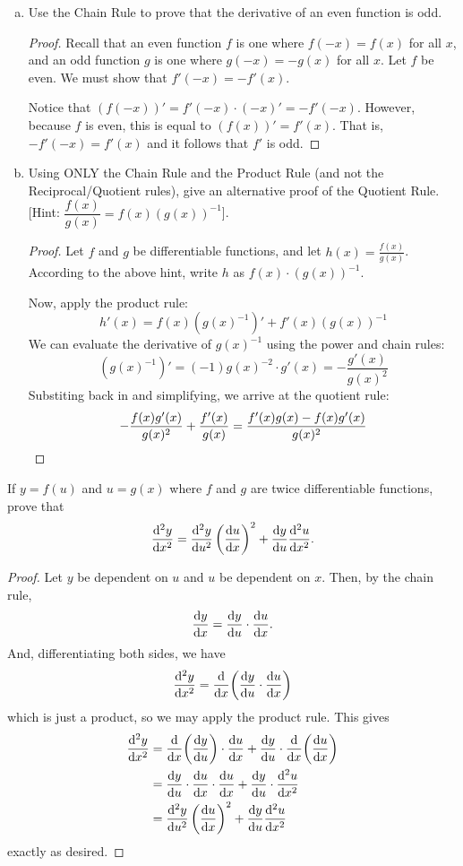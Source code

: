 \documentclass{agony}
\begin{document}
\question \begin{enumerate}[(a)]
  \item Use the Chain Rule to prove that the derivative of an even function is odd.
        \begin{proof}
          Recall that an even function $f$ is one where $f(-x)=f(x)$ for all $x$,
          and an odd function $g$ is one where $g(-x)=-g(x)$ for all $x$.
          Let $f$ be even. We must show that $f'(-x) = -f'(x)$.
          
          Notice that $(f(-x))' = f'(-x)\cdot(-x)' = -f'(-x)$.
          However, because $f$ is even, this is equal to $(f(x))' = f'(x)$.
          That is, $-f'(-x) = f'(x)$ and it follows that $f'$ is odd.
        \end{proof}
  \item Using ONLY the Chain Rule and the Product Rule (and not the Reciprocal/Quotient rules),
        give an alternative proof of the Quotient Rule.
          [Hint: $\dfrac{f(x)}{g(x)}=f(x)(g(x))^{-1}$].
        \begin{proof}
          Let $f$ and $g$ be differentiable functions, and let $h(x)=\frac{f(x)}{g(x)}$. 
          According to the above hint, write $h$ as $f(x) \cdot (g(x))^{-1}$.

          Now, apply the product rule:
          \[ h'(x) = f(x)(g(x)^{-1})' + f'(x)(g(x))^{-1} \]
          We can evaluate the derivative of $g(x)^{-1}$ using the power and chain rules:
          \[ (g(x)^{-1})' = (-1)g(x)^{-2}\cdot g'(x) = -\frac{g'(x)}{g(x)^2} \]
          Substiting back in and simplifying, we arrive at the quotient rule:
          \[ -\frac{f(x)g'(x)}{g(x)^2} + \frac{f'(x)}{g(x)} = \frac{f'(x)g(x)-f(x)g'(x)}{g(x)^2} \qedhere \]
        \end{proof}
\end{enumerate}


\question If $y=f(u)$ and $u=g(x)$ where $f$ and $g$ are twice differentiable functions, prove that
\[ \dv[2]{y}{x} = \dv[2]{y}{u}\left(\dv{u}{x}\right)^2 + \dv{y}{u}\dv[2]{u}{x}. \]
\begin{proof}
  Let $y$ be dependent on $u$ and $u$ be dependent on $x$.
  Then, by the chain rule,
  \[ \dv{y}{x} = \dv{y}{u} \cdot \dv{u}{x}. \]
  And, differentiating both sides, we have
  \[ \dv[2]{y}{x} = \dv{x}(\dv{y}{u} \cdot \dv{u}{x}) \]
  which is just a product, so we may apply the product rule. This gives
  \begin{align*}
    \dv[2]{y}{x} & = \dv{x}(\dv{y}{u})\cdot\dv{u}{x} + \dv{y}{u}\cdot\dv{x}(\dv{u}{x})  \\
                 & = \dv{y}{u}\cdot\dv{u}{x}\cdot\dv{u}{x} + \dv{y}{u}\cdot\dv[2]{u}{x} \\
                 & = \dv[2]{y}{u}\left(\dv{u}{x}\right)^2 + \dv{y}{u}\dv[2]{u}{x}
  \end{align*}
  exactly as desired.
\end{proof}
\end{document}
